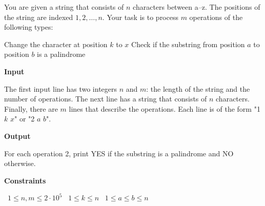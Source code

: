 You are given a string that consists of $n$ characters between a–z. The positions of the string are indexed $1,2,\dots,n$.
Your task is to process $m$ operations of the following types:

Change the character at position $k$ to $x$
Check if the substring from position $a$ to position $b$ is a palindrome

\vspace{0.3cm}\noindent\textbf{Input}

The first input line has two integers $n$ and $m$: the length of the string and the number of operations.
The next line has a string that consists of $n$ characters.
Finally, there are $m$ lines that describe the operations. Each line is of the form "1 $k$ $x$" or "2 $a$ $b$".

\vspace{0.3cm}\noindent\textbf{Output}

For each operation 2, print YES if the substring is a palindrome and NO otherwise.

\vspace{0.3cm}\noindent\textbf{Constraints}

\textbullet\ $1 \le n, m \le 2 \cdot 10^5$
\textbullet\ $1 \le k \le n$
\textbullet\ $1 \le a \le b \le n$